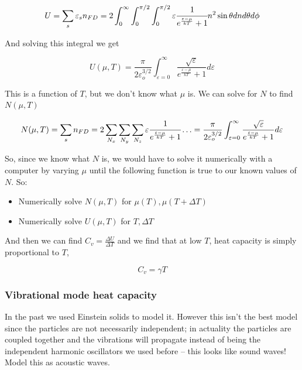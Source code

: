 \documentclass[10pt]{article}
\begin{document}
\begin{equation}
	U = \sum_s \varepsilon_s n_{FD} = 
	2 \int_0^{\infty} \int_0^{\pi /2} \int_0^{\pi /2}
	\varepsilon \cfrac{1}{e^{\frac{\varepsilon - \mu}{kT}} + 1} n^2 \sin \theta dn d\theta d\phi
\end{equation}

And solving this integral we get 

\begin{equation}
	U(\mu, T) = \frac{\pi}{2\varepsilon_o ^{3 /2}} \int_{\varepsilon = 0}^{\infty} \frac{\sqrt{\varepsilon} }{
e^{\frac{\varepsilon - \mu}{kT}} + 1
	} d\varepsilon
\end{equation}

This is a function of $ T $, but we don't know what $ \mu $ is. 
We can solve for $ N $ to find $ N(\mu, T) $ 

\begin{equation}
	N(\mu, T) = \sum_s n_{FD} = 
	2 \sum_{N_x} \sum_{N_y} \sum_{N_z} \varepsilon \cfrac{1}{e^{\frac{\varepsilon - \mu}{kT}} + 1} \ldots
	= \frac{\pi}{2\varepsilon_o ^{3 /2}} \int_{\varepsilon = 0}^{\infty} \frac{\sqrt{\varepsilon} }{
e^{\frac{\varepsilon - \mu}{kT}} + 1
	} d\varepsilon
\end{equation}




So, since we know what $ N $ is, we would have to solve it numerically with a computer by varying $ \mu $ until the following function is true to our known values of $ N $.
So:
\begin{itemize}
	\item Numerically solve $ N(\mu, T) $  for $ \mu(T), \mu(T + \Delta T)$ 
	\item Numerically solve $ U(\mu, T) $  for $ T, \Delta T $ 
\end{itemize}

And then we can find $ C_v = \frac{\Delta U}{\Delta T}$ and we find that at low $ T $, heat capacity is simply proportional to $ T $,  

\begin{equation}
	C_v = \gamma T
	\label{eq:294:metal_fermi_gas_heat_capacity}
\end{equation}



\subsubsection{Vibrational mode heat capacity}

In the past we used Einstein solids to model it. 
However this isn't the best model since the particles are not necessarily independent; in actuality the particles are coupled together and the vibrations will propagate instead of being the independent harmonic oscillators we used before -- this looks like sound waves!
Model this as acoustic waves.
\end{document}
